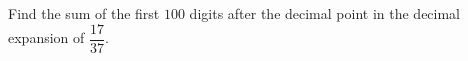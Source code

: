 Find the sum of the first $100$ digits after the decimal point in the decimal expansion of $\dfrac{17}{37}$.
